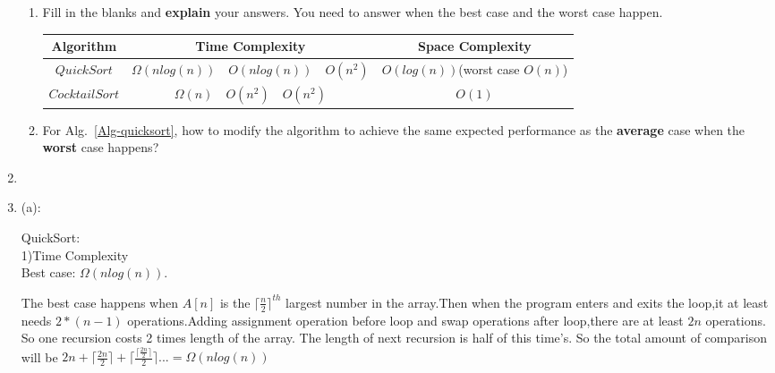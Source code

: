 \documentclass[12pt,a4paper]{article}
\makeatletter
\newtheorem*{solution}{Solution}
\theoremstyle{definition}
\renewenvironment{solution}[1][Solution] {\par\pushQED{\qed}\normalfont\topsep6\p@\@plus6\p@\relax\trivlist\item[\hskip\labelsep\bfseries#1\@addpunct{.}]\ignorespaces}{\popQED\endtrivlist\@endpefalse} \makeatother
\makeatother
\begin{document}
\begin{enumerate}
\begin{minipage}[t]{0.45\textwidth}
\begin{algorithm}[H]
		$i\leftarrow i+1$\;
	}
\end{algorithm}
\end{minipage}

\begin{enumerate}
	 
\item Fill in the blanks and \textbf{explain} your answers. You need to answer when the best case and the worst case happen. 
\begin{table}[!h]

\label{Tab-compare}
	\centering
	\begin{threeparttable}
	\begin{tabular}{c|c| c }
		\toprule[2pt]
		\textbf{Algorithm} & \textbf{Time Complexity}\tnote{1} & \textbf{Space Complexity} \\
		\hline
		\hline
		$QuickSort$ & $ \Omega (nlog(n))\quad O(nlog(n))\quad O(n^2) $&$O(log(n))$(worst case $O(n)$)  \\

		$CocktailSort$ & $\Omega (n)\quad O(n^2)\quad O(n^2)$ &$O(1)$   \\
		\bottomrule[2pt]


	\end{tabular}
	\end{threeparttable}
\end{table}

\item For Alg.~\ref{Alg-quicksort}, how to modify the algorithm to achieve the same expected performance as the \textbf{average} case when the \textbf{worst} case happens?
\end{enumerate} 




    \begin{solution}
    \item (a):
    
    QuickSort:\\
    1)Time Complexity\\
    Best case: $\Omega (nlog(n))$.\par
    The best case happens when $A[n]$ is the ${\lceil\frac{n}{2}\rceil}^{th}$ largest number in the array.Then when the program enters and exits the loop,it at least needs $2*(n-1)$ operations.Adding assignment operation before loop and swap operations after loop,there are at least $2n$ operations. So one recursion costs 2 times length of the array. The length of next recursion is half of this time's. So the total amount of comparison will be $2n+\lceil\frac{2n}{2}\rceil+\lceil\frac{\lceil\frac{2n}{2}\rceil}{2}\rceil...=\Omega (nlog(n))$ 
    

\end{solution}
\end{enumerate}
\end{document}

